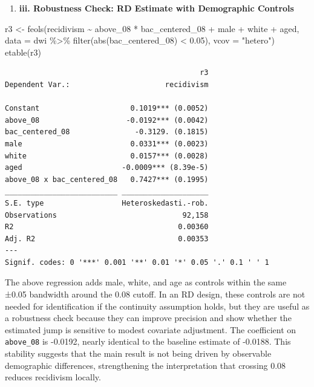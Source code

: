 \documentclass[
  letterpaper,
  DIV=11,
  numbers=noendperiod]{scrartcl}
\newenvironment{Shaded}{\begin{snugshade}}{\end{snugshade}}
\newcommand{\AttributeTok}[1]{\textcolor[rgb]{0.40,0.45,0.13}{#1}}
\newcommand{\FloatTok}[1]{\textcolor[rgb]{0.68,0.00,0.00}{#1}}
\newcommand{\FunctionTok}[1]{\textcolor[rgb]{0.28,0.35,0.67}{#1}}
\newcommand{\NormalTok}[1]{\textcolor[rgb]{0.00,0.23,0.31}{#1}}
\newcommand{\OtherTok}[1]{\textcolor[rgb]{0.00,0.23,0.31}{#1}}
\newcommand{\SpecialCharTok}[1]{\textcolor[rgb]{0.37,0.37,0.37}{#1}}
\newcommand{\StringTok}[1]{\textcolor[rgb]{0.13,0.47,0.30}{#1}}
\providecommand{\tightlist}{%
  \setlength{\itemsep}{0pt}\setlength{\parskip}{0pt}}
\begin{document}
\begin{enumerate}
\def\labelenumi{\arabic{enumi}.}
\setcounter{enumi}{6}
\tightlist
\item
  \textbf{iii. Robustness Check: RD Estimate with Demographic Controls}
\end{enumerate}

\begin{Shaded}
\begin{Highlighting}[]
\NormalTok{r3 }\OtherTok{\textless{}{-}} \FunctionTok{feols}\NormalTok{(recidivism }\SpecialCharTok{\textasciitilde{}}\NormalTok{ above\_08 }\SpecialCharTok{*}\NormalTok{ bac\_centered\_08 }\SpecialCharTok{+}\NormalTok{ male }\SpecialCharTok{+}\NormalTok{ white }\SpecialCharTok{+}\NormalTok{ aged,}
            \AttributeTok{data =}\NormalTok{ dwi }\SpecialCharTok{\%\textgreater{}\%} \FunctionTok{filter}\NormalTok{(}\FunctionTok{abs}\NormalTok{(bac\_centered\_08) }\SpecialCharTok{\textless{}} \FloatTok{0.05}\NormalTok{), }\AttributeTok{vcov =} \StringTok{"hetero"}\NormalTok{)}
\FunctionTok{etable}\NormalTok{(r3)}
\end{Highlighting}
\end{Shaded}

\begin{verbatim}
                                             r3
Dependent Var.:                      recidivism
                                               
Constant                     0.1019*** (0.0052)
above_08                    -0.0192*** (0.0042)
bac_centered_08               -0.3129. (0.1815)
male                         0.0331*** (0.0023)
white                        0.0157*** (0.0028)
aged                       -0.0009*** (8.39e-5)
above_08 x bac_centered_08   0.7427*** (0.1995)
__________________________ ____________________
S.E. type                  Heteroskedasti.-rob.
Observations                             92,158
R2                                      0.00360
Adj. R2                                 0.00353
---
Signif. codes: 0 '***' 0.001 '**' 0.01 '*' 0.05 '.' 0.1 ' ' 1
\end{verbatim}

The above regression adds male, white, and age as controls within the
same ±0.05 bandwidth around the 0.08 cutoff. In an RD design, these
controls are not needed for identification if the continuity assumption
holds, but they are useful as a robustness check because they can
improve precision and show whether the estimated jump is sensitive to
modest covariate adjustment. The coefficient on \texttt{above\_08} is
-0.0192, nearly identical to the baseline estimate of -0.0188. This
stability suggests that the main result is not being driven by
observable demographic differences, strengthening the interpretation
that crossing 0.08 reduces recidivism locally.
\end{document}
